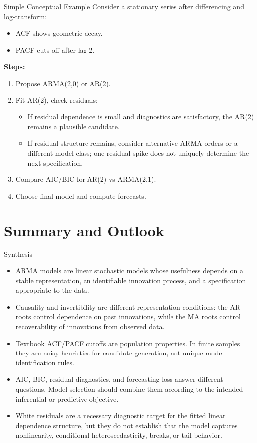 \documentclass{beamer}
\begin{document}
\begin{frame}{Simple Conceptual Example}
  Consider a stationary series after differencing and log-transform:
  \begin{itemize}
    \item ACF shows geometric decay.
    \item PACF cuts off after lag 2.
  \end{itemize}

  \vspace{0.3cm}
  \textbf{Steps:}
  \begin{enumerate}
    \item Propose ARMA(2,0) or AR(2).
    \item Fit AR(2), check residuals:
      \begin{itemize}
        \item If residual dependence is small and diagnostics are satisfactory, the AR(2) remains a plausible candidate.
        \item If residual structure remains, consider alternative ARMA orders or a different model class; one residual spike does not uniquely determine the next specification.
      \end{itemize}
    \item Compare AIC/BIC for AR(2) vs ARMA(2,1).
    \item Choose final model and compute forecasts.
  \end{enumerate}
\end{frame}

\section{Summary and Outlook}

\begin{frame}{Synthesis}
  \begin{itemize}
    \item ARMA models are linear stochastic models whose usefulness depends on a stable representation, an identifiable innovation process, and a specification appropriate to the data.
    \item Causality and invertibility are different representation conditions: the AR roots control dependence on past innovations, while the MA roots control recoverability of innovations from observed data.
    \item Textbook ACF/PACF cutoffs are population properties. In finite samples they are noisy heuristics for candidate generation, not unique model-identification rules.
    \item AIC, BIC, residual diagnostics, and forecasting loss answer different questions. Model selection should combine them according to the intended inferential or predictive objective.
    \item White residuals are a necessary diagnostic target for the fitted linear dependence structure, but they do not establish that the model captures nonlinearity, conditional heteroscedasticity, breaks, or tail behavior.
  \end{itemize}
\end{frame}
\end{document}
